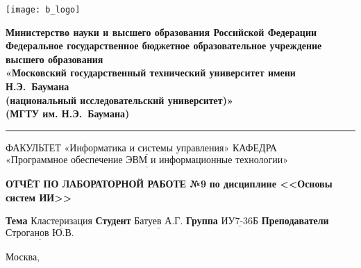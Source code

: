 \thispagestyle{empty}

\noindent \begin{minipage}{0.15\textwidth}
	\texttt{[image: b\_logo]}
\end{minipage}
\noindent\begin{minipage}{0.85\textwidth}\centering
	\textbf{Министерство науки и высшего образования Российской Федерации}\\
	\textbf{Федеральное государственное бюджетное образовательное учреждение высшего образования}\\
	\textbf{«Московский государственный технический университет имени Н.Э.~Баумана}\\
	\textbf{(национальный исследовательский университет)»}\\
	\textbf{(МГТУ им. Н.Э.~Баумана)}
\end{minipage}

\noindent\rule{\linewidth}{3pt}
\newline\newline
\noindent ФАКУЛЬТЕТ $\underline{\text{«Информатика и системы управления»}}$ \newline\newline
\noindent КАФЕДРА $\underline{\text{«Программное обеспечение ЭВМ и информационные технологии»}}$

\vspace{1cm}

\begin{center}
	\noindent\begin{minipage}{1.3\textwidth}\centering
		\Large\textbf{ОТЧЁТ ПО ЛАБОРАТОРНОЙ РАБОТЕ №9}\newline
		\textbf{по дисциплине <<Основы систем ИИ>>}\newline\newline
	\end{minipage}
\end{center}

\noindent\textbf{Тема} $\underline{\text{Кластеризация}}$\newline\newline
\noindent\textbf{Студент} $\underline{\text{Батуев А.Г.}}$\newline\newline
\noindent\textbf{Группа} $\underline{\text{ИУ7-36Б}}$\newline\newline
\noindent\textbf{Преподаватели} $\underline{\text{Строганов Ю.В.}}$\newline

\begin{center}
	\vfill
	Москва,~\the\year
\end{center}
\clearpage

